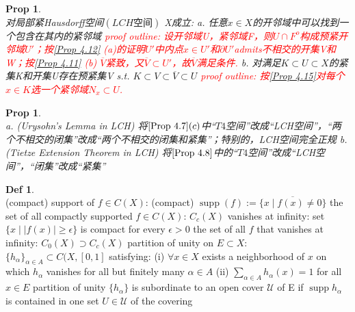 \documentclass[hidelinks]{article}
\theoremstyle{definition}
\newtheorem*{defin}{Def}
\theoremstyle{plain}
\newtheorem{proposition}[theorem]{Prop}
\theoremstyle{remark}
\DeclareMathOperator\supp{supp}
\begin{document}
\begin{proposition}\label{Prop 4.15}~\\
对局部紧Hausdorff空间$(LCH\textrm{空间})$ X成立:\newline
a. 任意$x\in X$的开邻域中可以找到一个包含在其内的紧邻域 \newline
\textcolor{red}{proof outline: 设开邻域U，紧邻域F，则$U\cap F^o$构成预紧开邻域$U'$；按\autoref{Prop 4.12} (a)的证明$U'$中内点$x\in U'$和$\partial U'$admits不相交的开集V和W；按\autoref{Prop 4.11} (b) $\overline{V}$紧致，又$\overline{V}\subset U'$，故$\overline{V}$满足条件.} \newline
b. 对满足$K\subset U\subset X$的紧集K和开集U存在预紧集V s.t. $K\subset V\subset \overline{V} \subset U$ \newline
\textcolor{red}{proof outline: 按\autoref{Prop 4.15}对每个$x\in K$选一个紧邻域$N_x\subset U$.}
\end{proposition}

\begin{proposition}~\\
a. (Urysohn's Lemma in LCH) 将$\autoref{Prop 4.7} (c)$中“$T4$空间”改成“LCH空间”，“两个不相交的闭集”改成“两个不相交的闭集和紧集”；特别的，LCH空间完全正规\newline
b. (Tietze Extension Theorem in LCH) 将$\autoref{Prop 4.8}$中的“$T4$空间”改成“LCH空间”，“闭集”改成“紧集”
\end{proposition}

\begin{defin}~\\
(compact) support of $f\in C(X)$: (compact) $\supp(f):=\overline{\{x\mid f(x)\neq 0\}}$ \newline
\indent the set of all compactly supported $f\in C(X)$: $C_c(X)$ \newline
vanishes at infinity: set $\{x\mid |f(x)|\geq \epsilon \}$ is compact for every $\epsilon >0$\newline
\indent the set of all $f$ that vanishes at infinity: $C_0(X)\supset C_c(X)$\newline
partition of unity on $E\subset X$: $\{h_\alpha\}_{\alpha \in A}\subset C(X,[0,1]$ satisfying:\newline
\indent (i) $\forall x\in X$ exists a neighborhood of $x$ on which $h_\alpha$ vanishes for all but finitely many $\alpha \in A$ \newline
\indent (ii) $\sum_{\alpha \in A}h_\alpha(x)=1$ for all $x\in E$ \newline
partition of unity $\{h_\alpha\}$ is subordinate to an open cover $\mathscr{U}$ of E if $\supp{h_\alpha}$ is contained in one set $U\in \mathscr{U}$ of the covering
\end{defin}
\end{document}
